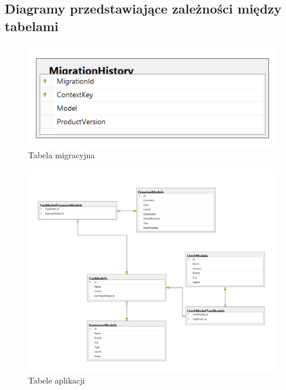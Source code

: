 \documentclass[10pt,titlepage]{article}
\begin{document}
\subsection{Diagramy przedstawiające zależności między tabelami}
\begin{figure}[htbp]
  \centering
  \includegraphics[scale=0.5]{images/db2.png}
  \caption{Tabela migracyjna}
\end{figure}
\begin{figure}[htbp]
  \centering
  \includegraphics[scale=0.5]{images/db1.png}
  \caption{Tabele aplikacji}
\end{figure}
\end{document}
